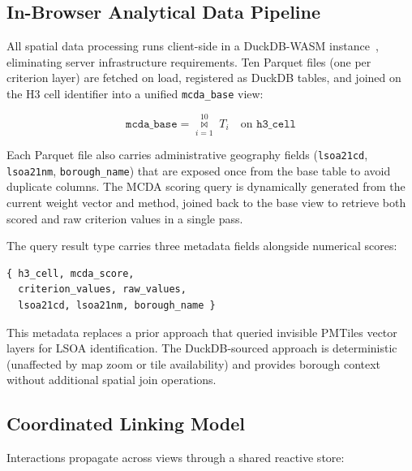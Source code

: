 \subsection{In-Browser Analytical Data Pipeline}
\label{sec:data-pipeline}

All spatial data processing runs client-side in a DuckDB-WASM instance~\cite{duckdb2019}, eliminating server infrastructure requirements. Ten Parquet files (one per criterion layer) are fetched on load, registered as DuckDB tables, and joined on the H3 cell identifier into a unified \texttt{mcda\_base} view:

\begin{equation}
\texttt{mcda\_base} = \underset{i=1}{\overset{10}{\bowtie}} \; T_i \quad \text{on } \texttt{h3\_cell}
\end{equation}

\noindent Each Parquet file also carries administrative geography fields (\texttt{lsoa21cd}, \texttt{lsoa21nm}, \texttt{borough\_name}) that are exposed once from the base table to avoid duplicate columns. The MCDA scoring query is dynamically generated from the current weight vector and method, joined back to the base view to retrieve both scored and raw criterion values in a single pass.

The query result type carries three metadata fields alongside numerical scores:

\begin{verbatim}
{ h3_cell, mcda_score,
  criterion_values, raw_values,
  lsoa21cd, lsoa21nm, borough_name }
\end{verbatim}

\noindent This metadata replaces a prior approach that queried invisible PMTiles vector layers for LSOA identification. The DuckDB-sourced approach is deterministic (unaffected by map zoom or tile availability) and provides borough context without additional spatial join operations.

\subsection{Coordinated Linking Model}
\label{sec:linking}

Interactions propagate across views through a shared reactive store:

